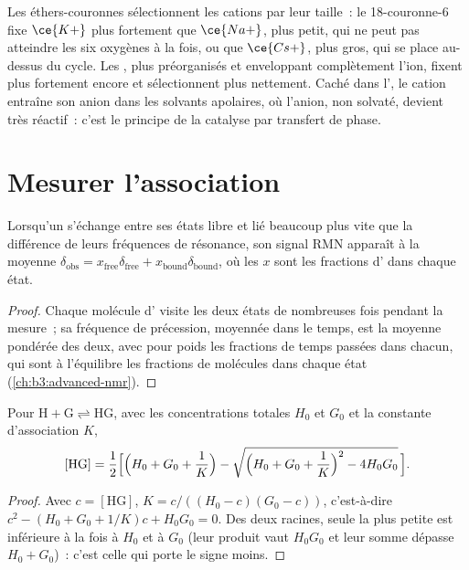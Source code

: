 Les éthers-couronnes sélectionnent les cations par leur taille~: le 18-couronne-6 fixe $\ce{K+}$ plus fortement que
$\ce{Na+}$, plus petit, qui ne peut pas atteindre les six oxygènes à la fois, ou que $\ce{Cs+}$, plus gros, qui
se place au-dessus du cycle. Les , plus préorganisés et
enveloppant complètement l'ion, fixent plus fortement encore et
sélectionnent plus nettement. Caché dans l', le cation entraîne son
anion dans les solvants apolaires, où l'anion, non solvaté, devient très
réactif~: c'est le principe de la catalyse par transfert de phase.

\section{Mesurer l'association}

\begin{proposition}\label{prop:b3:supramolecular:fast-exchange}
Lorsqu'un  s'échange entre ses états libre et lié beaucoup plus vite
que la différence de leurs fréquences de résonance, son signal RMN apparaît
à la moyenne
$\delta_{\mathrm{obs}} = x_{\mathrm{free}}\delta_{\mathrm{free}} + x_{\mathrm{bound}}\delta_{\mathrm{bound}}$, où les $x$ sont les fractions d' dans chaque état.
\end{proposition}

\begin{proof}
Chaque molécule d' visite les deux états de nombreuses fois pendant la
mesure~; sa fréquence de précession, moyennée dans le temps, est la moyenne
pondérée des deux, avec pour poids les fractions de temps passées dans
chacun, qui sont à l'équilibre les fractions de molécules dans chaque état
(\cref{ch:b3:advanced-nmr}).
\end{proof}

\begin{theorem}\label{thm:b3:supramolecular:isotherm}
Pour $\mathrm{H + G \rightleftharpoons HG}$, avec les concentrations totales $H_0$ et $G_0$ et la constante d'association $K$,
\[
  [\mathrm{HG}] = \frac{1}{2}\Bigl[\Bigl(H_0 + G_0 + \frac1K\Bigr) - \sqrt{\Bigl(H_0 + G_0 + \frac1K\Bigr)^2 - 4H_0G_0}\,\Bigr].
\]
\end{theorem}

\begin{proof}
Avec $c = [\mathrm{HG}]$, $K = c/((H_0 - c)(G_0 - c))$, c'est-à-dire $c^2 - (H_0 + G_0 + 1/K)c + H_0G_0 = 0$. Des deux racines,
seule la plus petite est inférieure à la fois à $H_0$ et à $G_0$ (leur produit vaut $H_0G_0$ et leur somme
dépasse $H_0 + G_0$)~: c'est celle qui porte le signe moins.
\end{proof}

